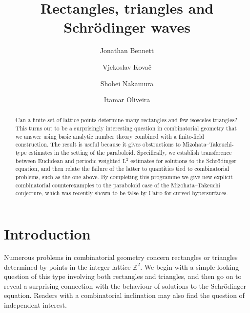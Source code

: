 \documentclass[11pt,reqno]{amsart}
\title[Rectangles, triangles and Schr\"{o}dinger waves]{Rectangles, triangles and Schr\"{o}dinger waves}
\author[Bennett]{Jonathan Bennett}
\author[Kova\v{c}]{Vjekoslav Kova\v{c}}
\author[Nakamura]{Shohei Nakamura}
\author[Oliveira]{Itamar Oliveira}
\numberwithin{equation}{section}
\begin{document}
\begin{abstract}
Can a finite set of lattice points determine many rectangles and few isosceles triangles? This turns out to be a surprisingly interesting question in combinatorial geometry that we answer using basic analytic number theory combined with a finite-field construction. The result is useful because it gives obstructions to Mizohata--Takeuchi-type estimates in the setting of the paraboloid. Specifically, we establish transference between Euclidean and periodic weighted $\mathrm{L}^2$ estimates for solutions to the Schr\"{o}dinger equation, and then relate the failure of the latter to quantities tied to combinatorial problems, such as the one above. By completing this programme we give new explicit combinatorial counterexamples to the paraboloid case of the Mizohata--Takeuchi conjecture, which was recently shown to be false by Cairo for curved hypersurfaces.
\end{abstract}

\maketitle

\tableofcontents


\section{Introduction}

Numerous problems in combinatorial geometry concern rectangles or triangles determined by points in the integer lattice $\mathbb{Z}^2$. We begin with a simple-looking question of this type involving both rectangles and triangles, and then go on to reveal a surprising connection with the behaviour of solutions to the Schr\"{o}dinger equation. Readers with a combinatorial inclination may also find the question of independent interest.
\end{document}
